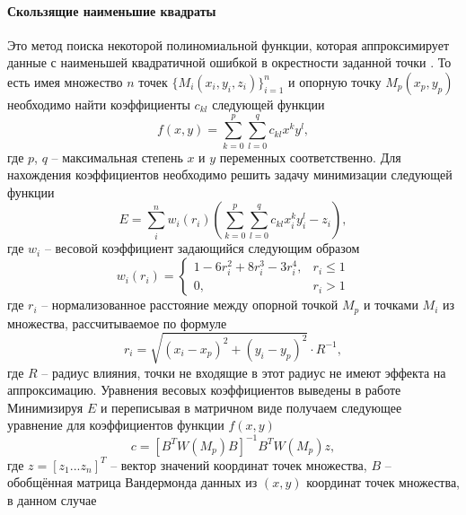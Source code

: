          \paragraph{Скользящие наименьшие квадраты}
         Это метод поиска некоторой полиномиальной функции, которая аппроксимирует данные с наименьшей квадратичной ошибкой в окрестности заданной точки \cite{Veerabhadra2017}. То есть имея множество $ n $ точек $ \{M_i(x_i, y_i, z_i)\}_{i=1}^{n} $ и опорную точку $ M_p(x_p, y_p) $ необходимо найти коэффициенты $ c_{kl} $ следующей функции
         \begin{equation}
             f(x,y)=\sum\limits_{k=0}^{p}\sum\limits_{l=0}^{q}c_{kl}x^ky^l,
         \end{equation}
         где $ p $, $ q $ -- максимальная степень $ x $ и $ y $ переменных соответственно.
         Для нахождения коэффициентов необходимо решить задачу минимизации следующей функции
         \begin{equation}
             E = \sum\limits_{i}^{n}w_i(r_i)\left(\sum\limits_{k=0}^{p}\sum\limits_{l=0}^{q}c_{kl}x_i^k y_i^l - z_i\right),
         \end{equation}
         где $ w_i $ -- весовой коэффициент задающийся следующим образом
         \begin{equation}
            w_i(r_i) = 
                     \begin{cases}
                         1-6r_i^2+8r_i^3-3r_i^4, &r_i \le 1\\
                         0, &r_i > 1
                     \end{cases}
         \end{equation}
         где $ r_i $ -- нормализованное расстояние между опорной точкой $ M_p $ и точками $ M_i $ из множества, рассчитываемое по формуле
         \begin{equation}
             r_i = \sqrt{(x_i-x_p)^2 + (y_i-y_p)^2}\cdot R^{-1},
         \end{equation}
         где $ R $ -- радиус влияния, точки не входящие в этот радиус не имеют эффекта на аппроксимацию.
         Уравнения весовых коэффициентов выведены в работе \cite{LI2008}
         Минимизируя $ E $ и переписывая в матричном виде получаем следующее уравнение для коэффициентов функции $ f(x,y) $
         \begin{equation}
             c = \left[B^T W(M_p) B\right]^{-1} B^T W(M_p) z,
         \end{equation}
         где $ z = [z_1 ... z_n]^T$ -- вектор значений координат точек множества, $ B $ -- обобщённая матрица Вандермонда данных из $ (x,y) $ координат точек множества, в данном случае
